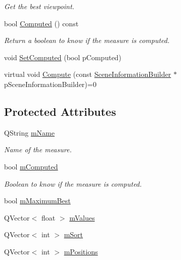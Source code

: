 \begin{DoxyCompactItemize}
\begin{DoxyCompactList}\small\item\em Get the best viewpoint. \end{DoxyCompactList}\item 
bool \hyperlink{class_measure_a6f388fcda566b8a6a01525711582fc25}{Computed} () const 
\begin{DoxyCompactList}\small\item\em Return a boolean to know if the measure is computed. \end{DoxyCompactList}\item 
void \hyperlink{class_measure_aa25e74d9f719420f80cf593e5ae131b9}{Set\+Computed} (bool p\+Computed)
\item 
virtual void \hyperlink{class_measure_aed88fe46b2a609ab5948e5f3c891321d}{Compute} (const \hyperlink{class_scene_information_builder}{Scene\+Information\+Builder} $\ast$p\+Scene\+Information\+Builder)=0
\end{DoxyCompactItemize}
\subsection*{Protected Attributes}
\begin{DoxyCompactItemize}
\item 
Q\+String \hyperlink{class_measure_aeb883353218500dc86ec1796d3fda8ca}{m\+Name}
\begin{DoxyCompactList}\small\item\em Name of the measure. \end{DoxyCompactList}\item 
bool \hyperlink{class_measure_ad8c5d0edcb2993eb305f5b3d0a1008c5}{m\+Computed}
\begin{DoxyCompactList}\small\item\em Boolean to know if the measure is computed. \end{DoxyCompactList}\item 
bool \hyperlink{class_measure_aecad8c5f694baa1a3061d24beb6b83d5}{m\+Maximum\+Best}
\item 
Q\+Vector$<$ float $>$ \hyperlink{class_measure_a846983f9253d5cd4eceb6cb0409c630e}{m\+Values}
\item 
Q\+Vector$<$ int $>$ \hyperlink{class_measure_acbeb61267b8c88b11254a4ab3d475de8}{m\+Sort}
\item 
Q\+Vector$<$ int $>$ \hyperlink{class_measure_a89450e6468c55f7b04ba20cff16af5d4}{m\+Positions}
\end{DoxyCompactItemize}



